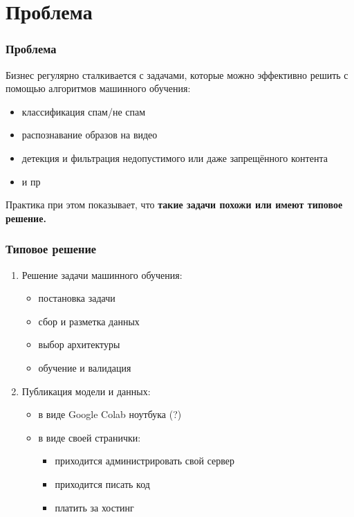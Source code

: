 \section{Проблема}
\begin{frame}
\frametitle{Проблема}
Бизнес регулярно сталкивается с задачами, которые можно эффективно решить с помощью алгоритмов машинного обучения:
\begin{itemize}
    \item классификация спам/не спам
    \item распознавание образов на видео
    \item детекция и фильтрация недопустимого или даже запрещённого контента
    \item и пр
\end{itemize}

Практика при этом показывает, что \textbf{такие задачи похожи или имеют типовое решение.}
\end{frame}

\begin{frame}
\frametitle{Типовое решение}
\begin{enumerate}
    \item Решение задачи машинного обучения:
    \begin{itemize}
        \item постановка задачи
        \item сбор и разметка данных
        \item выбор архитектуры
        \item обучение и валидация
    \end{itemize}
    \item Публикация модели и данных:
    \begin{itemize}
        \item в виде Google Colab ноутбука (?)
        \item в виде своей странички:
        \begin{itemize}
            \item приходится администрировать свой сервер
            \item приходится писать код
            \item платить за хостинг
        \end{itemize}
    \end{itemize}
\end{enumerate}
\end{frame}

